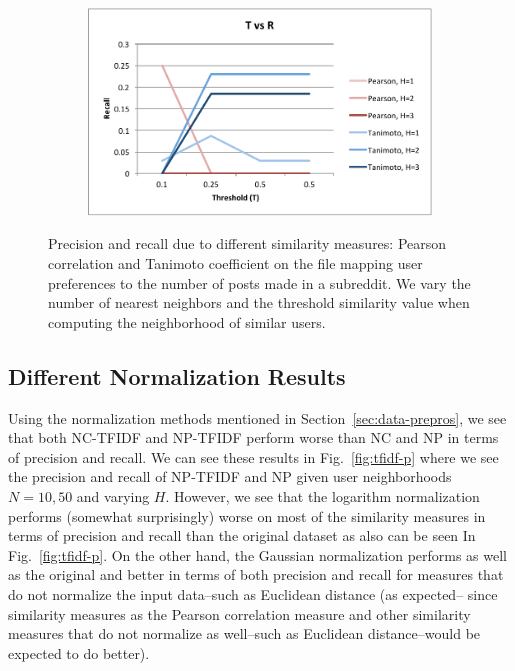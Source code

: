 \documentclass{article}
\begin{document}
\begin{figure}[H]
\begin{subfigure}{.4\textwidth}
  \label{fig:nvr}
\end{subfigure}%
\begin{subfigure}{.4\textwidth}
  \centering
  \includegraphics[width=.9\linewidth]{img/tvr.pdf}
  \label{fig:tvr}
\end{subfigure}
\caption{Precision and recall due to different similarity measures: Pearson correlation and
Tanimoto coefficient on the file mapping user preferences
to the number of posts made in a subreddit. We vary the number of nearest
neighbors and the threshold similarity value when computing 
the neighborhood of similar users.}\label{fig:learning-rate-hidden-layers}
\end{figure}

\subsection{Different Normalization Results}\label{sec:different-normalization}

Using the normalization methods mentioned in Section~\ref{sec:data-prepros}, 
we see that both NC-TFIDF and NP-TFIDF perform worse than NC and NP in 
terms of precision and recall. We can see these 
results in Fig.~\ref{fig:tfidf-p} where we see the precision and recall of NP-TFIDF and NP given user neighborhoods
$N =10, 50$ and varying $H$. However, we see that the logarithm normalization 
performs (somewhat surprisingly) worse on most of the similarity measures in terms of precision and recall
than the original dataset as also can be seen In Fig.~\ref{fig:tfidf-p}. On the other hand, the 
Gaussian normalization performs as well as the original and better in terms of
both precision and recall for measures that do not normalize the input data--such as 
Euclidean distance (as expected--
since similarity measures as the Pearson correlation measure and other
similarity measures that do not normalize as well--such as Euclidean distance--would be 
expected to do better). 
\end{document}
